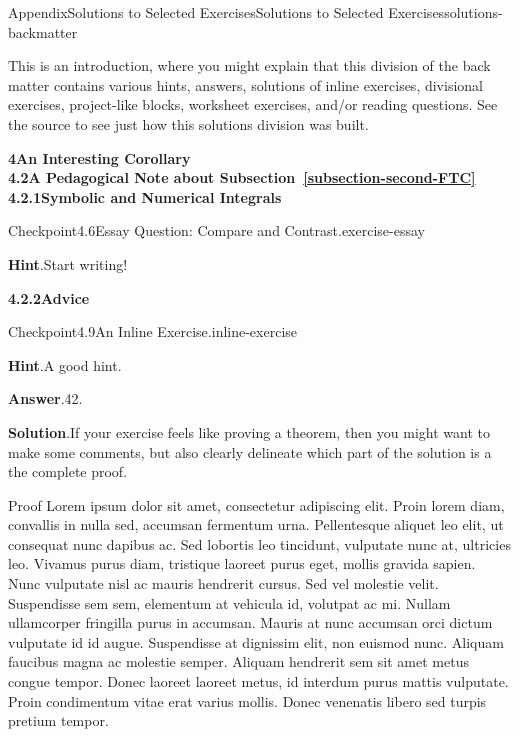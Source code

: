 \documentclass[twoside,10pt,]{article}
\newcommand{\blocktitlefont}{\relax}
\newcommand{\xreffont}{\relax}
\numberwithin{equation}{section}
\begin{document}
\begin{solutions-section}{Appendix}{Solutions to Selected Exercises}{}{Solutions to Selected Exercises}{}{}{solutions-backmatter}
%
\begin{introduction}{}%
This is an introduction, where you might explain that this division of the back matter contains various hints, answers, solutions of inline exercises, divisional exercises, project-like blocks, worksheet exercises, and\slash{}or reading questions.  See the source to see just how this solutions division was built.%
\end{introduction}%
\par\medskip
\noindent\textbf{\large{}4\space\textperiodcentered\space{}An Interesting Corollary\\
4.2\space\textperiodcentered\space{}A Pedagogical Note about Subsection~{\xreffont\ref*{subsection-second-FTC}}\\
4.2.1\space\textperiodcentered\space{}Symbolic and Numerical Integrals}
\begin{inlinesolution}{Checkpoint}{4.6}{Essay Question: Compare and Contrast.}{exercise-essay}%
\par\smallskip%
\noindent\textbf{\blocktitlefont Hint}.\hypertarget{exercise-essay-3-back}{}\quad{}Start writing!%
\end{inlinesolution}%
\par\medskip
\noindent\textbf{\large{}4.2.2\space\textperiodcentered\space{}Advice}
\begin{inlinesolution}{Checkpoint}{4.9}{An Inline Exercise.}{inline-exercise}%
\par\smallskip%
\noindent\textbf{\blocktitlefont Hint}.\hypertarget{inline-exercise-3-back}{}\quad{}A good hint.%
\par\smallskip%
\noindent\textbf{\blocktitlefont Answer}.\hypertarget{inline-exercise-4-back}{}\quad{}42.%
\par\smallskip%
\noindent\textbf{\blocktitlefont Solution}.\hypertarget{inline-exercise-5-back}{}\quad{}If your exercise feels like proving a theorem, then you might want to make some comments, but also clearly delineate which part of the solution is a the complete proof.%
\begin{solutionproof}{Proof}
Lorem ipsum dolor sit amet, consectetur adipiscing elit. Proin lorem diam, convallis in nulla sed, accumsan fermentum urna. Pellentesque aliquet leo elit, ut consequat nunc dapibus ac. Sed lobortis leo tincidunt, vulputate nunc at, ultricies leo. Vivamus purus diam, tristique laoreet purus eget, mollis gravida sapien. Nunc vulputate nisl ac mauris hendrerit cursus. Sed vel molestie velit. Suspendisse sem sem, elementum at vehicula id, volutpat ac mi. Nullam ullamcorper fringilla purus in accumsan. Mauris at nunc accumsan orci dictum vulputate id id augue. Suspendisse at dignissim elit, non euismod nunc. Aliquam faucibus magna ac molestie semper. Aliquam hendrerit sem sit amet metus congue tempor. Donec laoreet laoreet metus, id interdum purus mattis vulputate. Proin condimentum vitae erat varius mollis. Donec venenatis libero sed turpis pretium tempor.%

\end{solutionproof}
\end{inlinesolution}
\end{solutions-section}
\end{document}
